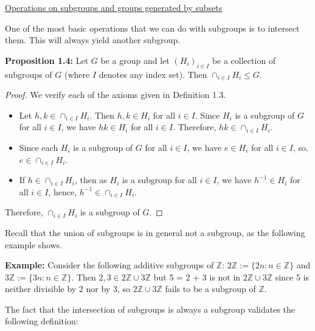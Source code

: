 \documentclass[12pt]{article}
\newcommand{\vs}{\vskip10pt}
\begin{document}
	\vs
	
	\underline{Operations on subgroups and groups generated by subsets}
	
	\vs 
	
	One of the most basic operations that we can do with subgroups is to intersect them. This will always yield another subgroup. 
	
	\vs 
	
	\textbf{Proposition 1.4:} Let $G$ be a group and let $(H_i)_{i \in I}$ be a collection of subgroups of $G$ (where $I$ denotes any index set). Then $\cap_{i \in I} H_i \leq G$. 
	
	\vs 
	
	\begin{proof}
		We verify each of the axioms given in Definition 1.3. 
		
		\begin{itemize}
			\item Let $h,k \in \cap_{i \in I} H_i$. Then $h,k \in H_i$ for all $i \in I$. Since $H_i$ is a subgroup of $G$ for all $i \in I$, we have $hk \in H_i$ for all $i \in I$. Therefore, $hk \in \cap_{i \in I} H_i$. 
			\item Since each $H_i$ is a subgroup of $G$ for all $i \in I$, we have $e \in H_i$ for all $i \in I$, so, $e \in \cap_{i \in I} H_i$. 
			\item If $h \in \cap_{i \in I} H_i$, then as $H_i$ is a subgroup for all $i \in I$, we have $h^{-1} \in H_i$ for all $i \in I$, hence, $h^{-1} \in \cap_{i \in I} H_i$. 
		\end{itemize}
	
		Therefore, $\cap_{i \in I} H_i$ is a subgroup of $G$.
	
	\end{proof}
	
	Recall that the union of subgroups is in general not a subgroup, as the following example shows. 
	
	\vs
	
	\textbf{Example: } Consider the following additive subgroups of $\mathbb{Z}$: $2 \mathbb{Z} := \{2n: n \in \mathbb{Z}\}$ and $3 \mathbb{Z} := \{3n: n \in \mathbb{Z}\}$. Then $2,3 \in 2\mathbb{Z} \cup 3\mathbb{Z}$ but 5 = 2 + 3 is not in $2 \mathbb{Z} \cup 3 \mathbb{Z}$ since 5 is neither divisible by 2 nor by 3, so $2 \mathbb{Z} \cup 3 \mathbb{Z}$ fails to be a subgroup of $\mathbb{Z}$. 
	
	\vs 
	
	The fact that the intersection of subgroups is always a subgroup validates the following definition: 
	
\end{document}
